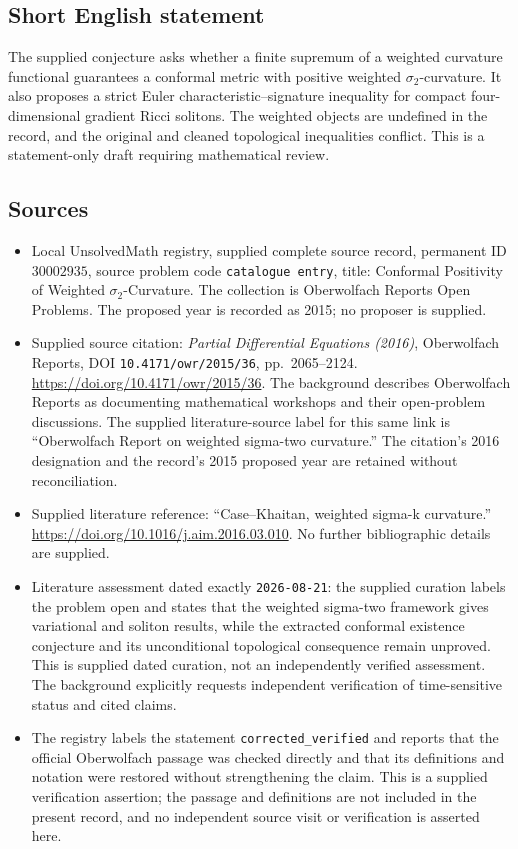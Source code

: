 \documentclass[11pt]{article}
\begin{document}
\subsection{Short English statement}
The supplied conjecture asks whether a finite supremum of a weighted curvature functional guarantees a conformal metric with positive weighted \(\sigma_2\)-curvature. It also proposes a strict Euler characteristic--signature inequality for compact four-dimensional gradient Ricci solitons. The weighted objects are undefined in the record, and the original and cleaned topological inequalities conflict. This is a statement-only draft requiring mathematical review.
\subsection{Sources}
\begin{itemize}
\item Local UnsolvedMath registry, supplied complete source record, permanent ID \(30002935\), source problem code \texttt{catalogue entry}, title: Conformal Positivity of Weighted \(\sigma_2\)-Curvature. The collection is Oberwolfach Reports Open Problems. The proposed year is recorded as 2015; no proposer is supplied.
\item Supplied source citation: \emph{Partial Differential Equations (2016)}, Oberwolfach Reports, DOI \texttt{10.4171/owr/2015/36}, pp.\ 2065--2124. \url{https://doi.org/10.4171/owr/2015/36}. The background describes Oberwolfach Reports as documenting mathematical workshops and their open-problem discussions. The supplied literature-source label for this same link is ``Oberwolfach Report on weighted sigma-two curvature.'' The citation's 2016 designation and the record's 2015 proposed year are retained without reconciliation.
\item Supplied literature reference: ``Case--Khaitan, weighted sigma-k curvature.'' \url{https://doi.org/10.1016/j.aim.2016.03.010}. No further bibliographic details are supplied.
\item Literature assessment dated exactly \texttt{2026-08-21}: the supplied curation labels the problem open and states that the weighted sigma-two framework gives variational and soliton results, while the extracted conformal existence conjecture and its unconditional topological consequence remain unproved. This is supplied dated curation, not an independently verified assessment. The background explicitly requests independent verification of time-sensitive status and cited claims.
\item The registry labels the statement \texttt{corrected\_verified} and reports that the official Oberwolfach passage was checked directly and that its definitions and notation were restored without strengthening the claim. This is a supplied verification assertion; the passage and definitions are not included in the present record, and no independent source visit or verification is asserted here.
\end{itemize}
\end{document}

